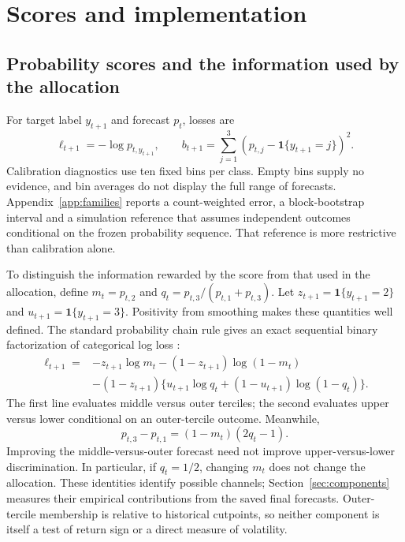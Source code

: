 \section{Scores and implementation}
\subsection{Probability scores and the information used by the allocation}
For target label $y_{t+1}$ and forecast $p_t$, losses are
\begin{equation}
\ell_{t+1}=-\log p_{t,y_{t+1}},\qquad
b_{t+1}=\sum_{j=1}^3\left(p_{t,j}-\mathbf{1}\{y_{t+1}=j\}\right)^2.
\label{eq:scores}
\end{equation}
Calibration diagnostics use ten fixed bins per class. Empty bins supply no evidence, and bin averages do not display the full range of forecasts. Appendix~\ref{app:families} reports a count-weighted error, a block-bootstrap interval and a simulation reference that assumes independent outcomes conditional on the frozen probability sequence. That reference is more restrictive than calibration alone.

To distinguish the information rewarded by the score from that used in the allocation, define $m_t=p_{t,2}$ and $q_t=p_{t,3}/(p_{t,1}+p_{t,3})$. Let $z_{t+1}=\mathbf{1}\{y_{t+1}=2\}$ and $u_{t+1}=\mathbf{1}\{y_{t+1}=3\}$. Positivity from smoothing makes these quantities well defined. The standard probability chain rule gives an exact sequential binary factorization of categorical log loss \citep[Chapter~2]{CoverThomas1991}:
\begin{equation}
\begin{split}
\ell_{t+1}={}&-z_{t+1}\log m_t-(1-z_{t+1})\log(1-m_t)\\
&-(1-z_{t+1})\{u_{t+1}\log q_t+(1-u_{t+1})\log(1-q_t)\}.
\end{split}
\label{eq:scorefactor}
\end{equation}
The first line evaluates middle versus outer terciles; the second evaluates upper versus lower conditional on an outer-tercile outcome. Meanwhile,
\begin{equation}
p_{t,3}-p_{t,1}=(1-m_t)(2q_t-1).
\label{eq:tiltfactor}
\end{equation}
Improving the middle-versus-outer forecast need not improve upper-versus-lower discrimination. In particular, if $q_t=1/2$, changing $m_t$ does not change the allocation. These identities identify possible channels; Section~\ref{sec:components} measures their empirical contributions from the saved final forecasts. Outer-tercile membership is relative to historical cutpoints, so neither component is itself a test of return sign or a direct measure of volatility.

